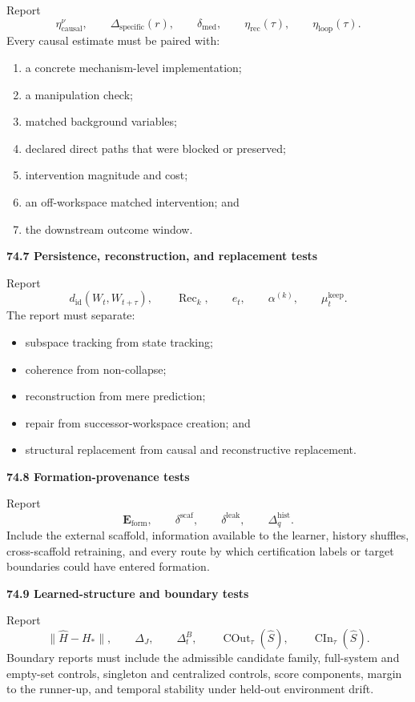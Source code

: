 \documentclass[11pt,letterpaper]{article}
\newcommand{\COut}{\operatorname{COut}}
\newcommand{\CIn}{\operatorname{CIn}}
\newcommand{\Rec}{\operatorname{Rec}}
\newcommand{\subtopic}[1]{%
 \vspace{0.45em}
 {\bfseries\color{AccentColor} #1\par}
}
\theoremstyle{plain}
\theoremstyle{definition}
\begin{document}
Report
\[
\eta_{\mathrm{causal}}^\nu,
\qquad
\Delta_{\mathrm{specific}}(r),
\qquad
\delta_{\mathrm{med}},
\qquad
\eta_{\mathrm{rec}}(\tau),
\qquad
\eta_{\mathrm{loop}}(\tau).
\]
Every causal estimate must be paired with:
\begin{enumerate}
\item a concrete mechanism-level implementation;
\item a manipulation check;
\item matched background variables;
\item declared direct paths that were blocked or preserved;
\item intervention magnitude and cost;
\item an off-workspace matched intervention; and
\item the downstream outcome window.
\end{enumerate}

\subtopic{74.7 Persistence, reconstruction, and replacement tests}

Report
\[
d_{\mathrm{id}}(W_t,W_{t+\tau}),
\qquad
\Rec_k,
\qquad
 e_t,
\qquad
\alpha^{(k)},
\qquad
\mu_t^{\mathrm{keep}}.
\]
The report must separate:
\begin{itemize}
\item subspace tracking from state tracking;
\item coherence from non-collapse;
\item reconstruction from mere prediction;
\item repair from successor-workspace creation; and
\item structural replacement from causal and reconstructive replacement.
\end{itemize}

\subtopic{74.8 Formation-provenance tests}

Report
\[
\mathbf E_{\mathrm{form}},
\qquad
\delta^{\mathrm{scaf}},
\qquad
\delta^{\mathrm{leak}},
\qquad
\Delta_q^{\mathrm{hist}}.
\]
Include the external scaffold, information available to the learner, history
shuffles, cross-scaffold retraining, and every route by which certification
labels or target boundaries could have entered formation.

\subtopic{74.9 Learned-structure and boundary tests}

Report
\[
\|\widehat H-H_*\|,
\qquad
\Delta_J,
\qquad
\Delta_t^B,
\qquad
\COut_\tau(\widehat S),
\qquad
\CIn_\tau(\widehat S).
\]
Boundary reports must include the admissible candidate family, full-system and
empty-set controls, singleton and centralized controls, score components,
margin to the runner-up, and temporal stability under held-out environment
drift.
\end{document}
